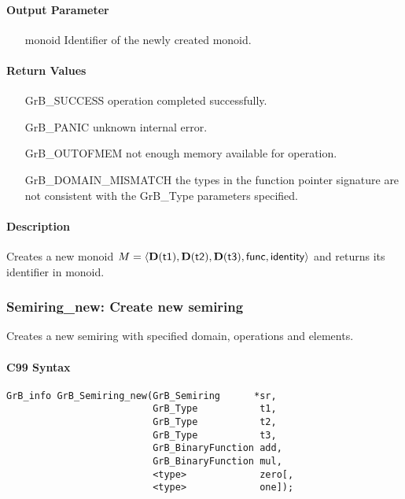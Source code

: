 \paragraph{Output Parameter}

\begin{itemize}[leftmargin=1.1in]
    \item[{\sf monoid}] Identifier of the newly created monoid.
\end{itemize}

\paragraph{Return Values}

\begin{itemize}[leftmargin=2.1in]
\item[{\sf GrB\_SUCCESS}]           operation completed successfully.
\item[{\sf GrB\_PANIC}]             unknown internal error.
\item[{\sf GrB\_OUTOFMEM}]          not enough memory available for operation.
\item[{\sf GrB\_DOMAIN\_MISMATCH}]  the types in the function pointer signature are not   
                                    consistent with the {\sf GrB\_Type} parameters specified.
\end{itemize}

\paragraph{Description}

Creates a new monoid $M = \langle \bold{D}({\sf t1}), \bold{D}({\sf t2}), 
\bold{D}({\sf t3}), {\sf func}, {\sf identity} \rangle$ and
returns its identifier in {\sf monoid}.


\subsubsection{{\sf Semiring\_new}: Create new semiring}

Creates a new semiring with specified domain, operations and elements.

\paragraph{C99 Syntax}

\begin{verbatim}
GrB_info GrB_Semiring_new(GrB_Semiring      *sr,
                          GrB_Type           t1,
                          GrB_Type           t2,
                          GrB_Type           t3,
                          GrB_BinaryFunction add,
                          GrB_BinaryFunction mul,
                          <type>             zero[,
                          <type>             one]);
\end{verbatim}

